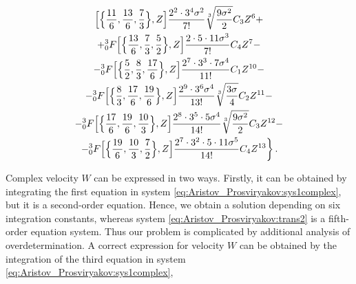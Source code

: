 \begin{multline}
\Bigl[\Bigl\{\frac{11}{6}, \frac{13}{6}, \frac{7}{3} \Bigr\},Z\Bigr] \frac{2^2\cdot 3^4\sigma^2}{7!}\sqrt[3]{\frac{9\sigma^2}{2}} C_3 Z^6+

\\

+{^{3}_{0}F} \Bigl[\Bigl\{\frac{13}{6}, \frac{7}{3}, \frac{5}{2} \Bigr\},Z\Bigr] \frac{2\cdot 5\cdot 11\sigma^3}{7!} C_4 Z^7-

\\

-{^{3}_{0}F} \Bigl[\Bigl\{\frac{5}{2}, \frac{8}{3}, \frac{17}{6} \Bigr\},Z\Bigr] \frac{2^7\cdot 3^3\cdot 7\sigma^4}{11!} C_1 Z^{10}-

\\

-{^{3}_{0}F} \Bigl[\Bigl\{\frac{8}{3}, \frac{17}{6}, \frac{19}{6} \Bigr\},Z\Bigr] \frac{2^9\cdot 3^6\sigma^4}{13!}\sqrt[3]{\frac{3\sigma}{4}} C_2 Z^{11}-

\\

-{^{3}_{0}F} \Bigl[\Bigl\{\frac{17}{6}, \frac{19}{6}, \frac{10}{3} \Bigr\},Z\Bigr] \frac{2^8\cdot 3^5\cdot 5\sigma^4}{14!}\sqrt[3]{\frac{9\sigma^2}{2}} C_3 Z^{12}-

\\

\left.

-{^{3}_{0}F} \Bigl[\Bigl\{\frac{19}{6}, \frac{10}{3}, \frac{7}{2} \Bigr\},Z\Bigr] \frac{2^7\cdot 3^2\cdot 5\cdot 11\sigma^5}{14!} C_4 Z^{13}

\right\}.

\end{multline}





Complex velocity $W$  can be expressed in two ways. Firstly, it can be obtained by integrating the first equation in system \eqref{eq:Aristov_Prosviryakov:sys1complex}, but it is a second-order equation. Hence, we obtain a solution depending on six integration constants, whereas system \eqref{eq:Aristov_Prosviryakov:trans2} is a fifth-order equation system. Thus our problem is complicated by additional analysis of overdetermination. A correct expression for velocity $W$  can be obtained by the integration of the third equation in system \eqref{eq:Aristov_Prosviryakov:sys1complex},

